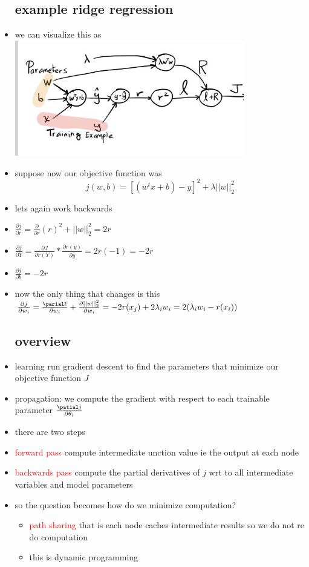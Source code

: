 \documentclass{article}
\begin{document}
\begin{itemize}
\subsection{example ridge regression}
\item we can visualize this as \\ \includegraphics[width=10cm]{lecture_notes/lecture_11/immages/l11_14.JPG}
\item suppose now our objective function was $$j(w,b)=[(w^tx+b)-y]^2+\lambda ||w||_{2}^2$$
\item lets again work backwards 
\item $\frac{\partial j}{\partial r}=\frac{\partial }{\partial r}(r)^2+||w||_{2}^2=2r$
\item $\frac{\partial j}{\partial Y}=\frac{\partial J}{\partial r(Y)}*\frac{\partial r(y)}{\partial\hat{y}}= 2r(-1)=-2r$
\item $\frac{\partial j}{\partial b} = -2r$
\item now the only thing that changes is this $\frac{\partial j}{\partial w_i}=\frac{\parial \ell}{\partial w_i}+\frac{\partial ||w||^{2}_2}{\partial w_i}=-2r(x_j)+2\lambda_iw_i=2(\lambda_iw_i-r(x_i))$
\subsection{overview}
\item learning run gradient descent to find the parameters that minimize our objective function $J$
\item propagation: we compute the gradient with respect to each trainable parameter $\frac{\patial j}{\partial \theta_i}$
\item there are two steps 
\item \textcolor{red }{forward pass} compute intermediate unction value ie the output at each node 
\item \textcolor{red }{backwards pass} compute the partial derivatives of $j$ wrt to all intermediate variables and model parameters 
\item so the question becomes how do we minimize computation?
\begin{itemize}
    \item \textcolor{red}{path sharing} that is each node caches intermediate results so we do not re do computation 
    \item this is dynamic programming 
\end{itemize}

\end{itemize}
\end{document}
